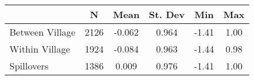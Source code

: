 \begin{tabular}{l*{5}{c}}\hline&\multicolumn{1}{c}{N}&\multicolumn{1}{c}{Mean}&\multicolumn{1}{c}{St. Dev}&\multicolumn{1}{c}{Min}&\multicolumn{1}{c}{Max}\\ \hline 
Between Village & 2126 & -0.062 & 0.964 & -1.41 & 1.00 \\
Within Village & 1924 & -0.084 & 0.963 & -1.44 & 0.98 \\
Spillovers & 1386 & 0.009 & 0.976 & -1.41 & 1.00 \\
\hline \end{tabular}
